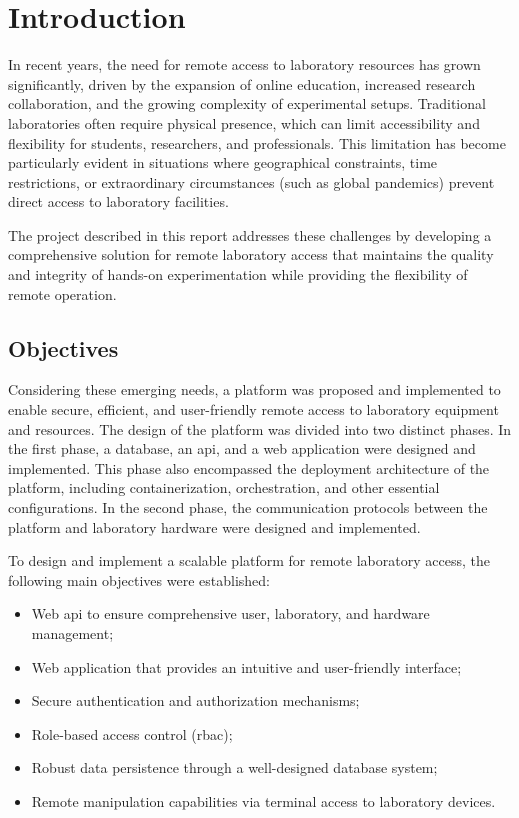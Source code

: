 %
%
\chapter{Introduction}\label{cap:intro}
In recent years, the need for remote access to laboratory resources has grown significantly, driven by the expansion of online education, increased research collaboration, and the growing complexity of experimental setups. Traditional laboratories often require physical presence, which can limit accessibility and flexibility for students, researchers, and professionals. This limitation has become particularly evident in situations where geographical constraints, time restrictions, or extraordinary circumstances (such as global pandemics) prevent direct access to laboratory facilities.

The project described in this report addresses these challenges by developing a comprehensive solution for remote laboratory access that maintains the quality and integrity of hands-on experimentation while providing the flexibility of remote operation.

%
%
\section{Objectives}\label{sec:objectives}
Considering these emerging needs, a platform was proposed and implemented to enable secure, efficient, and user-friendly remote access to laboratory equipment and resources. The design of the platform was divided into two distinct phases. In the first phase, a database, an \ac{api}, and a web application were designed and implemented. This phase also encompassed the deployment architecture of the platform, including containerization, orchestration, and other essential configurations. In the second phase, the communication protocols between the platform and laboratory hardware were designed and implemented.

To design and implement a scalable platform for remote laboratory access, the following main objectives were established:
\begin{itemize}
\item Web \acs{api} to ensure comprehensive user, laboratory, and hardware management;
\item Web application that provides an intuitive and user-friendly interface;
\item Secure authentication and authorization mechanisms;
\item Role-based access control (\ac{rbac});
\item Robust data persistence through a well-designed database system;
\item Remote manipulation capabilities via terminal access to laboratory devices.
\end{itemize}

